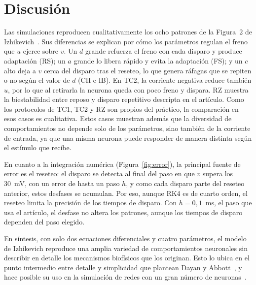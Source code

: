 \documentclass[10pt,a4paper,twocolumn]{article}
\begin{document}
\section{Discusión}

Las simulaciones reproducen cualitativamente los ocho patrones de la Figura~2 de
Izhikevich~\cite{izhikevich2003}. Sus diferencias se explican por cómo los parámetros regulan el
freno que $u$ ejerce sobre $v$. Un $d$ grande refuerza el freno con cada disparo y
produce adaptación (RS); un $a$ grande lo libera rápido y evita la adaptación (FS); y
un $c$ alto deja a $v$ cerca del disparo tras el reseteo, lo que genera ráfagas que se
repiten o no según el valor de $d$ (CH e IB). En TC2, la corriente negativa reduce
también $u$, por lo que al retirarla la neurona queda con poco freno y dispara. RZ
muestra la biestabilidad entre reposo y disparo repetitivo descripta en el artículo.
Como los protocolos de TC1, TC2 y RZ son propios del práctico, la comparación en esos
casos es cualitativa. Estos casos muestran además que la diversidad de
comportamientos no depende solo de los parámetros, sino también de la corriente de
entrada, ya que una misma neurona puede responder de manera distinta según el
estímulo que recibe.

En cuanto a la integración numérica (Figura~\ref{fig:error}), la principal fuente de
error es el reseteo: el disparo se detecta al final del paso en que $v$ supera los
30~mV, con un error de hasta un paso $h$, y como cada disparo parte del reseteo
anterior, estos desfases se acumulan. Por eso, aunque RK4 es de cuarto orden, el
reseteo limita la precisión de los tiempos de disparo. Con $h = 0,1$~ms, el paso que
usa el artículo, el desfase no altera los patrones, aunque los tiempos de disparo
dependen del paso elegido.

En síntesis, con solo dos ecuaciones diferenciales y cuatro parámetros, el modelo de
Izhikevich reproduce una amplia variedad de comportamientos neuronales sin describir
en detalle los mecanismos biofísicos que los originan. Esto lo ubica en el punto
intermedio entre detalle y simplicidad que plantean Dayan y Abbott~\cite{dayan2001}, y hace
posible su uso en la simulación de redes con un gran número de neuronas~\cite{izhikevich2003}.
\end{document}
